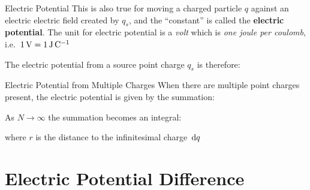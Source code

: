 \documentclass[12pt,aspectratio=169]{beamer}
\begin{document}
\begin{frame}{Electric Potential}
  This is also true for moving a charged particle $q$ against an electric
  electric field created by $q_s$, and the ``constant'' is called the
  \textbf{electric potential}. The unit for electric potential is a \emph{volt}
  which is \emph{one joule per coulomb}, i.e.\
  $\SI1\volt=\SI1{\joule\per\coulomb}$


  The electric potential from a source point charge $q_s$ is therefore:

\end{frame}



\begin{frame}{Electric Potential from Multiple Charges}
  When there are multiple point charges present, the electric potential is
  given by the summation:


  As $N\rightarrow\infty$ the summation becomes an integral:


  where $r$ is the distance to the infinitesimal charge $\dl q$
\end{frame}



\section{Electric Potential Difference}
\end{document}

